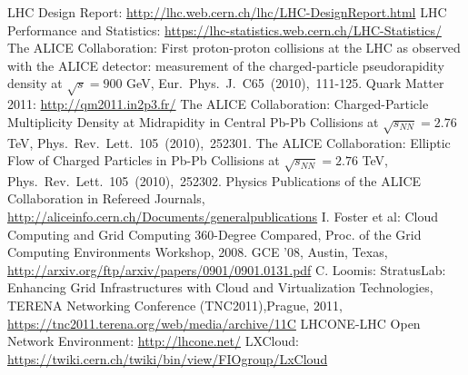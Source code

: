 \documentclass{intech}
\begin{document}
\begin{thebibliography}{100}
%
%
 LHC Design Report:
\url{http://lhc.web.cern.ch/lhc/LHC-DesignReport.html}
%
 LHC Performance and Statistics:
\newline\url{https://lhc-statistics.web.cern.ch/LHC-Statistics/}
%
 The ALICE Collaboration: First proton-proton
collisions at the LHC as observed with the ALICE detector:
measurement of the charged-particle
        pseudorapidity density at $\sqrt{s}=900$ GeV, Eur.~Phys.~J.~C65~(2010),~111-125.
%
 Quark Matter 2011: \url{http://qm2011.in2p3.fr/}
%
 The ALICE
Collaboration: Charged-Particle Multiplicity Density at Midrapidity
in Central Pb-Pb Collisions at $\sqrt{s_{NN}}=2.76$ TeV,
        Phys.~Rev.~Lett.~105~(2010),~252301.
%
 The ALICE Collaboration: Elliptic Flow of Charged Particles
in Pb-Pb Collisions at $\sqrt{s_{NN}}=2.76$ TeV,
Phys.~Rev.~Lett.~105~(2010),~252302.
%
 Physics Publications of the ALICE
Collaboration in Refereed Journals,
\newline\url{http://aliceinfo.cern.ch/Documents/generalpublications}
%
%
 I. Foster et al: Cloud Computing and Grid Computing
360-Degree Compared, Proc. of the Grid Computing Environments
Workshop, 2008. GCE '08, Austin, Texas,
\newline\url{http://arxiv.org/ftp/arxiv/papers/0901/0901.0131.pdf}
%
 C. Loomis: StratusLab: Enhancing Grid Infrastructures with
Cloud and Virtualization Technologies, TERENA Networking Conference
(TNC2011),Prague, 2011,
\newline\url{https://tnc2011.terena.org/web/media/archive/11C}
%
 LHCONE-LHC Open Network Environment:
\newline\url{http://lhcone.net/}
%
 LXCloud:
\url{https://twiki.cern.ch/twiki/bin/view/FIOgroup/LxCloud}








\end{thebibliography}
\end{document}
